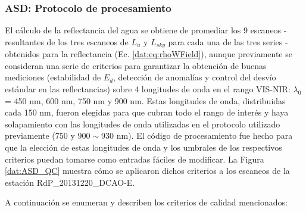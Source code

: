         \subsubsection{ASD: Protocolo de procesamiento}
        \label{dat:s:asdProc}
        
            El cálculo de la reflectancia del agua se obtiene de promediar los 9 escaneos - resultantes de los tres escaneos de $L_{u}$ y $L_{sky}$ para cada una de las tres series - obtenidos para la reflectancia (Ec. \ref{dat:eq:rhoWField}), aunque previamente se consideran una serie de criterios para garantizar la obtención de buenas mediciones (estabilidad de $E_{d}$, detección de anomalías y control del desvío estándar en las reflectancias) sobre 4 longitudes de onda en el rango VIS-NIR: $\lambda_{0}$ = 450 nm, 600 nm, 750 nm y 900 nm. Estas longitudes de onda,  distribuidas cada 150 nm, fueron elegidas para que cubran todo el rango de interés y haya solapamiento con las longitudes de onda utilizadas en el protocolo utilizado previamente ($750$ y $900\sim930$ nm). El código de procesamiento fue hecho para que la elección de estas longitudes de onda y los umbrales de los respectivos criterios puedan tomarse como entradas fáciles de modificar. La Figura \ref{dat:ASD_QC} muestra cómo se aplicaron dichos criterios a los escaneos de la estación RdP\_20131220\_DCAO-E.
            
            A continuación se enumeran y describen los criterios de calidad mencionados:

